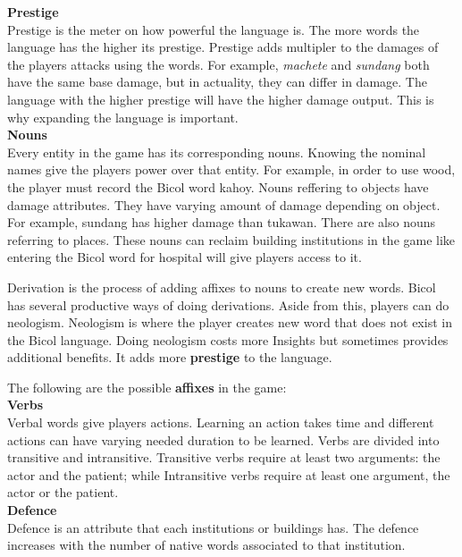 \documentclass[11pt]{article}
\begin{document}
\textbf{Prestige}\\
Prestige  is the meter on how powerful the language is. The more words the language has the higher its prestige. Prestige adds multipler to the damages of the players attacks using the words. For example, \textit{machete} and \textit{sundang} both have the same base damage, but in actuality, they can differ in damage. The language with the higher prestige will have the higher damage output. This is why expanding the language is important.\\

\textbf{Nouns}\\
Every entity in the game has its corresponding nouns. Knowing the nominal names give the players power over that entity. For example, in order to use wood, the player must record the Bicol word kahoy. Nouns reffering to objects have damage attributes. They have varying amount of damage depending on object. For example, sundang has higher damage than tukawan.
There are also nouns referring to places. These nouns can reclaim building institutions in the game like entering the Bicol word for hospital will give players access to it.

Derivation is the process of adding affixes to nouns to create new words. Bicol has several productive ways of doing derivations. Aside from this, players can do neologism. Neologism is where the player creates new word that does not exist in the Bicol language. Doing neologism costs more Insights but sometimes provides additional benefits. It adds more \textbf{prestige} to the language.

The following are the possible \textbf{affixes} in the game:\\


\textbf{Verbs}\\
Verbal words give players actions. Learning an action takes time and different actions can have varying needed duration to be learned. Verbs are divided into transitive and intransitive. Transitive verbs require at least two arguments: the actor and the patient; while Intransitive verbs require at least one argument, the actor or the patient.\\

\textbf{Defence}\\
Defence is an attribute that each institutions or buildings has. The defence increases with the number of native words associated to that institution.\\
\end{document}
